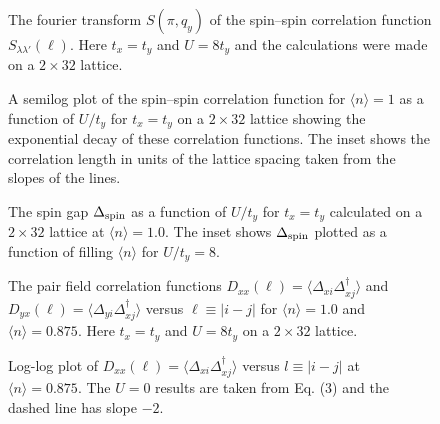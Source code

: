 \begin{figure}
\caption{
The fourier transform $S(\pi,q_y)$
of the spin--spin correlation function $S_{\lambda \lambda'}(\ell)$.
Here $t_x=t_y$ and $U=8t_y$ and the calculations were made on a
$2 \times 32$ lattice.
}
\label{figSq}
\end{figure}

\begin{figure}
\caption{
A semilog plot of the spin--spin
correlation function for $\langle n \rangle = 1$ as a
function of $U/t_y$  for $t_x=t_y$ on a $2 \times 32$ lattice showing
the exponential decay of these correlation functions.
The inset shows the correlation length in units of the lattice
spacing taken from the slopes of the lines.
}
\label{figlS11}
\end{figure}

\begin{figure}
\caption{
The spin gap $\Delta_{\rm spin}$ as a function of $U/t_y$ for $t_x=t_y$
calculated on a $2\times 32$ lattice at $\langle n \rangle=1.0$.
The inset shows $\Delta_{\rm spin}$ plotted as a function of filling
$\langle n \rangle$ for $U/t_y=8$.
}
\label{figgap}
\end{figure}

\begin{figure}
\caption{
The pair field correlation functions
$D_{xx}(\ell) = \langle \Delta_{x i} \Delta^\dagger_{x j} \rangle$ and
$D_{yx}(\ell) = \langle \Delta_{y i} \Delta^\dagger_{x j} \rangle$
versus $\ell \equiv | i-j |$ for $\langle n \rangle = 1.0$ and
$\langle n \rangle = 0.875$.
Here $t_x=t_y$ and $U=8t_y$ on a $2 \times 32$ lattice.
}
\label{figDxxyx}
\end{figure}

\begin{figure}
\caption{
Log-log plot of
$D_{xx}(\ell) = \langle \Delta_{x i} \Delta^\dagger_{x j} \rangle$
versus
$l \equiv | i-j |$ at $\langle n \rangle = 0.875$.
The $U=0$ results are taken from Eq. (3)
and the dashed line has slope $-2$.
}
\label{figllDx}
\end{figure}




